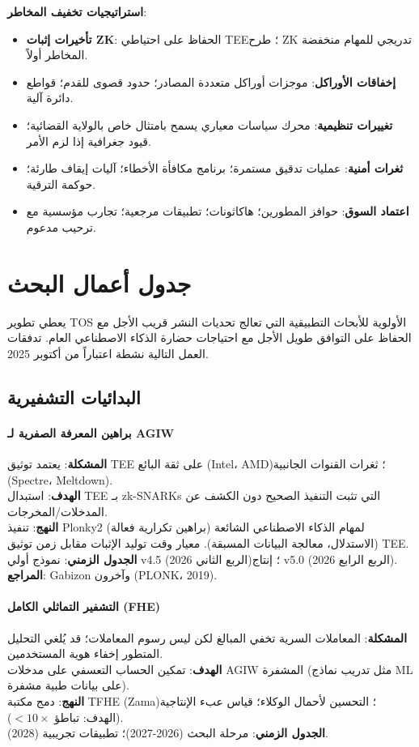 \documentclass[11pt]{article}
\begin{document}
\textbf{استراتيجيات تخفيف المخاطر}:
\begin{itemize}[noitemsep]
  \item \textbf{تأخيرات إثبات ZK}: الحفاظ على احتياطي TEE؛ طرح ZK تدريجي للمهام منخفضة المخاطر أولاً.
  \item \textbf{إخفاقات الأوراكل}: موجزات أوراكل متعددة المصادر؛ حدود قصوى للقدم؛ قواطع دائرة آلية.
  \item \textbf{تغييرات تنظيمية}: محرك سياسات معياري يسمح بامتثال خاص بالولاية القضائية؛ قيود جغرافية إذا لزم الأمر.
  \item \textbf{ثغرات أمنية}: عمليات تدقيق مستمرة؛ برنامج مكافأة الأخطاء؛ آليات إيقاف طارئة؛ حوكمة الترقية.
  \item \textbf{اعتماد السوق}: حوافز المطورين؛ هاكاثونات؛ تطبيقات مرجعية؛ تجارب مؤسسية مع ترحيب مدعوم.
\end{itemize}

\section{جدول أعمال البحث}
\label{sec:research}

يعطي تطوير TOS الأولوية للأبحاث التطبيقية التي تعالج تحديات النشر قريب الأجل مع الحفاظ على التوافق طويل الأجل مع احتياجات حضارة الذكاء الاصطناعي العام. تدفقات العمل التالية نشطة اعتباراً من أكتوبر 2025.

\subsection{البدائيات التشفيرية}

\paragraph{براهين المعرفة الصفرية لـ AGIW}
\textbf{المشكلة}: يعتمد توثيق TEE على ثقة البائع (Intel، AMD)؛ ثغرات القنوات الجانبية (Spectre، Meltdown).\\
\textbf{الهدف}: استبدال TEE بـ zk-SNARKs التي تثبت التنفيذ الصحيح دون الكشف عن المدخلات/المخرجات.\\
\textbf{النهج}: تنفيذ Plonky2 (براهين تكرارية فعالة) لمهام الذكاء الاصطناعي الشائعة (الاستدلال، معالجة البيانات المسبقة). معيار وقت توليد الإثبات مقابل زمن توثيق TEE.\\
\textbf{الجدول الزمني}: نموذج أولي v4.5 (الربع الثاني 2026)؛ إنتاج v5.0 (الربع الرابع 2026).\\
\textbf{المراجع}: Gabizon وآخرون (PLONK، 2019).

\paragraph{التشفير التماثلي الكامل (FHE)}
\textbf{المشكلة}: المعاملات السرية تخفي المبالغ لكن ليس رسوم المعاملات؛ قد يُلغي التحليل المتطور إخفاء هوية المستخدمين.\\
\textbf{الهدف}: تمكين الحساب التعسفي على مدخلات AGIW المشفرة (مثل تدريب نماذج ML على بيانات طبية مشفرة).\\
\textbf{النهج}: دمج مكتبة TFHE (Zama)؛ التحسين لأحمال الوكلاء؛ قياس عبء الإنتاجية (الهدف: تباطؤ $<10\times$).\\
\textbf{الجدول الزمني}: مرحلة البحث (2026-2027)؛ تطبيقات تجريبية (2028).
\end{document}

